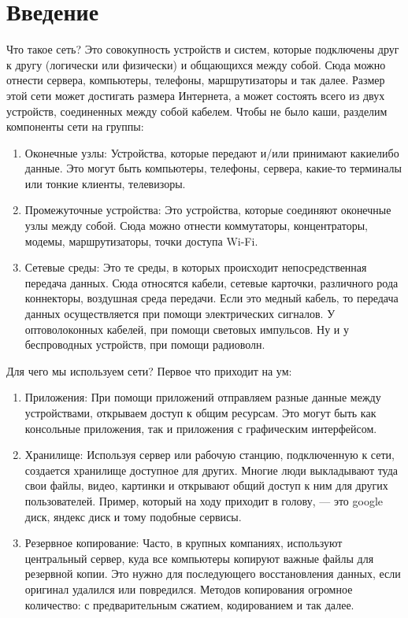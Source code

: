 \section{Введение}
Что такое сеть? 
Это совокупность устройств и систем, которые подключены друг к другу (логически или физически) и общающихся между собой. 
Сюда можно отнести сервера, компьютеры, телефоны, маршрутизаторы и так далее.
Размер этой сети может достигать размера Интернета, а может состоять всего из двух устройств, соединенных между собой кабелем. 
Чтобы не было каши, разделим компоненты сети на группы:
\begin{enumerate}
	\item Оконечные узлы: Устройства, которые передают и/или принимают какиелибо данные. Это могут быть компьютеры, телефоны, сервера, какие-то
	терминалы или тонкие клиенты, телевизоры.
	\item Промежуточные устройства: Это устройства, которые соединяют оконечные узлы между собой. Сюда можно отнести коммутаторы, концентраторы, модемы, маршрутизаторы, точки доступа Wi-Fi.
	\item Сетевые среды: Это те среды, в которых происходит непосредственная
	передача данных. Сюда относятся кабели, сетевые карточки, различного
	рода коннекторы, воздушная среда передачи. Если это медный кабель, то
	передача данных осуществляется при помощи электрических сигналов. У
	оптоволоконных кабелей, при помощи световых импульсов. Ну и у беспроводных устройств, при помощи радиоволн.

\end{enumerate}

Для чего мы используем сети?
Первое что приходит на ум:

\begin{enumerate}
	\item Приложения: При помощи приложений отправляем разные данные между
	устройствами, открываем доступ к общим ресурсам. Это могут быть как
	консольные приложения, так и приложения с графическим интерфейсом.
	\item Хранилище: Используя сервер или рабочую станцию, подключенную к
	сети, создается хранилище доступное для других. Многие люди выкладывают туда свои файлы, видео, картинки и открывают общий доступ к ним
	для других пользователей. Пример, который на ходу приходит в голову,
	— это google диск, яндекс диск и тому подобные сервисы.
	\item Резервное копирование: Часто, в крупных компаниях, используют центральный сервер, куда все компьютеры копируют важные файлы для резервной копии. Это нужно для последующего восстановления данных, если оригинал удалился или повредился. Методов копирования огромное
	количество: с предварительным сжатием, кодированием и так далее.

\end{enumerate}

